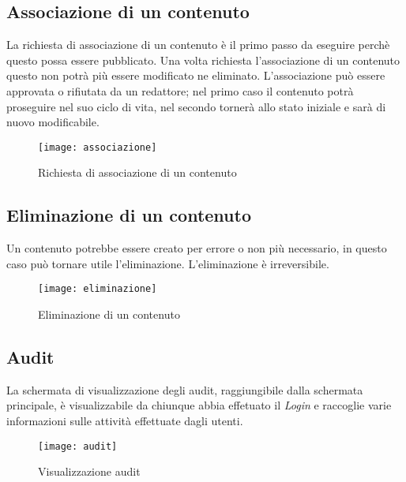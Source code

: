 \subsection{Associazione di un contenuto}
La richiesta di associazione di un contenuto è il primo passo da eseguire perchè questo possa essere pubblicato. Una volta richiesta l'associazione di un contenuto questo non potrà più essere modificato ne eliminato. L'associazione può essere approvata o rifiutata da un redattore; nel primo caso il contenuto potrà proseguire nel suo ciclo di vita, nel secondo tornerà allo stato iniziale e sarà di nuovo modificabile.
\begin{figure}[h]
    \begin{center}
    \texttt{[image: associazione]}
    \caption{Richiesta di associazione di un contenuto}
    \label{fig:figure28}
    \end{center}
\end{figure}

\subsection{Eliminazione di un contenuto}
Un contenuto potrebbe essere creato per errore o non più necessario, in questo caso può tornare utile l'eliminazione. L'eliminazione è irreversibile.
\begin{figure}[h]
    \begin{center}
    \texttt{[image: eliminazione]}
    \caption{Eliminazione di un contenuto}
    \label{fig:figure29}
    \end{center}
\end{figure}

\subsection{Audit}
La schermata di visualizzazione degli audit, raggiungibile dalla schermata principale, è visualizzabile da chiunque abbia effetuato il \textit{Login} e raccoglie varie informazioni sulle attività effettuate dagli utenti.
\begin{figure}[h]
    \begin{center}
    \texttt{[image: audit]}
    \caption{Visualizzazione audit}
    \label{fig:figure30}
    \end{center}
\end{figure}

